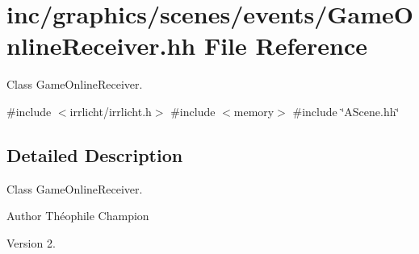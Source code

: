 \hypertarget{GameOnlineReceiver_8hh}{}\section{inc/graphics/scenes/events/\+Game\+Online\+Receiver.hh File Reference}
\label{GameOnlineReceiver_8hh}


Class Game\+Online\+Receiver.  


{\ttfamily \#include $<$irrlicht/irrlicht.\+h$>$}\newline
{\ttfamily \#include $<$memory$>$}\newline
{\ttfamily \#include \char`\"{}A\+Scene.\+hh\char`\"{}}\newline


\subsection{Detailed Description}
Class Game\+Online\+Receiver. 

\begin{DoxyAuthor}{Author}
Théophile Champion 
\end{DoxyAuthor}
\begin{DoxyVersion}{Version}
2. 
\end{DoxyVersion}
